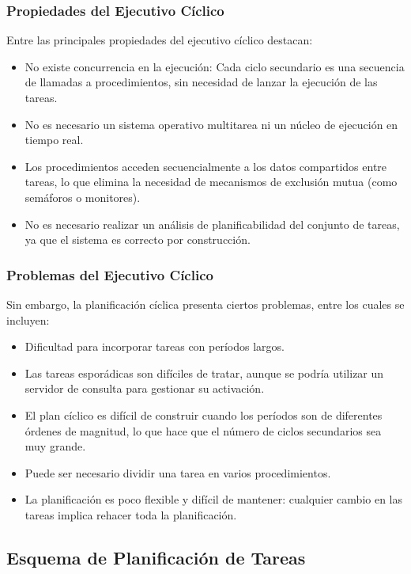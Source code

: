 \documentclass[a4paper,12pt]{article}
\begin{document}
\subsubsection{Propiedades del Ejecutivo Cíclico}

Entre las principales propiedades del ejecutivo cíclico destacan:

\begin{itemize}
    \item No existe concurrencia en la ejecución: Cada ciclo secundario es una secuencia de llamadas a procedimientos, sin necesidad de lanzar la ejecución de las tareas.
    \item No es necesario un sistema operativo multitarea ni un núcleo de ejecución en tiempo real.
    \item Los procedimientos acceden secuencialmente a los datos compartidos entre tareas, lo que elimina la necesidad de mecanismos de exclusión mutua (como semáforos o monitores).
    \item No es necesario realizar un análisis de planificabilidad del conjunto de tareas, ya que el sistema es correcto por construcción.
\end{itemize}

\subsubsection{Problemas del Ejecutivo Cíclico}

Sin embargo, la planificación cíclica presenta ciertos problemas, entre los cuales se incluyen:

\begin{itemize}
    \item Dificultad para incorporar tareas con períodos largos.
    \item Las tareas esporádicas son difíciles de tratar, aunque se podría utilizar un servidor de consulta para gestionar su activación.
    \item El plan cíclico es difícil de construir cuando los períodos son de diferentes órdenes de magnitud, lo que hace que el número de ciclos secundarios sea muy grande.
    \item Puede ser necesario dividir una tarea en varios procedimientos.
    \item La planificación es poco flexible y difícil de mantener: cualquier cambio en las tareas implica rehacer toda la planificación.
\end{itemize}

\subsection{Esquema de Planificación de Tareas}
\end{document}
